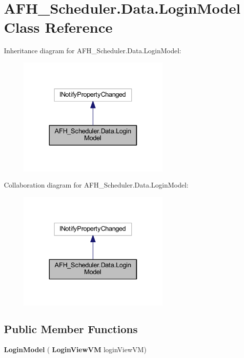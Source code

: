 \section{A\+F\+H\+\_\+\+Scheduler.\+Data.\+Login\+Model Class Reference}
\label{class_a_f_h___scheduler_1_1_data_1_1_login_model}


Inheritance diagram for A\+F\+H\+\_\+\+Scheduler.\+Data.\+Login\+Model\+:
\nopagebreak
\begin{figure}[H]
\begin{center}
\leavevmode
\includegraphics[width=214pt]{class_a_f_h___scheduler_1_1_data_1_1_login_model__inherit__graph}
\end{center}
\end{figure}


Collaboration diagram for A\+F\+H\+\_\+\+Scheduler.\+Data.\+Login\+Model\+:
\nopagebreak
\begin{figure}[H]
\begin{center}
\leavevmode
\includegraphics[width=214pt]{class_a_f_h___scheduler_1_1_data_1_1_login_model__coll__graph}
\end{center}
\end{figure}
\subsection*{Public Member Functions}
\begin{DoxyCompactItemize}
\item 
\textbf{ Login\+Model} (\textbf{ Login\+View\+VM} login\+View\+VM)
\end{DoxyCompactItemize}
